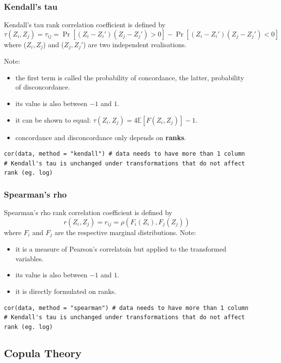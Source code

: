 \documentclass[11pt]{article}
\newcommand{\noi}{\noindent}
\begin{document}
\subsubsection{Kendall's tau}
\noi Kendall's tau rank correlation coefficient is defined by
$$\tau(Z_i, Z_j) = \tau_{ij} = \Pr[(Z_i-Z_i')(Z_j-Z_j')>0] - \Pr[(Z_i - Z_i')(Z_j-Z_j') < 0]$$
\noi where ($Z_i, Z_j$) and ($Z_j, Z_j'$) are two independent realisations.

\noi Note:
\begin{itemize}
    \item the first term is called the probability of concordance, the latter, probability of disconcordance.
    \item its value is also between $-1$ and $1$.
    \item it can be shown to equal: $\tau(Z_i, Z_j) = 4\mathbb{E}[F(Z_i, Z_j)] - 1$.
    \item concordance and disconcordance only depends on \textbf{ranks}.
\end{itemize}
\begin{lstlisting}
cor(data, method = "kendall") # data needs to have more than 1 column
# Kendall's tau is unchanged under transformations that do not affect rank (eg. log)
\end{lstlisting}

\subsubsection{Spearman's rho}
\noi Spearman's rho rank correlation coefficient is defined by
$$r(Z_i, Z_j) = r_{ij} = \rho(F_i(Z_i), F_j(Z_j))$$
\noi where $F_i$ and $F_j$ are the respective marginal distributions. Note:
\begin{itemize}
    \item it is a measure of Pearson's correlatoin but applied to the transformed variables.
    \item its value is also between $-1$ and $1$.
    \item it is directly formulated on ranks.
\end{itemize}
\begin{lstlisting}
cor(data, method = "spearman") # data needs to have more than 1 column
# Kendall's tau is unchanged under transformations that do not affect rank (eg. log)
\end{lstlisting}

\subsection{Copula Theory}
\end{document}
